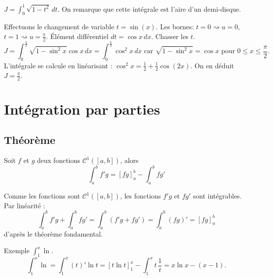 \begin{exple}
 $J = \int_{0}^{1}\sqrt{1-t^2}\,dt$. On remarque que cette intégrale est l'aire d'un demi-disque.
 
Effectuons le changement de variable $t=\sin(x)$.\newline
Les bornes: $t = 0\rightsquigarrow u = 0$, $t = 1\rightsquigarrow u = \frac{\pi}{2}$.\newline
\'Elément différentiel $dt = \cos x\,dx$.\newline
Chasser les $t$.
\[
 J = \int^{\frac{\pi}{2}}_{0}\sqrt{1-\sin^2x}\cos x\,dx
 = \int^{\frac{\pi}{2}}_{0}\cos^2 x\,dx \text{ car } \sqrt{1-\sin^2x}= \cos x \text{ pour } 0\leq x \leq \frac{\pi}{2}.
\]
L'intégrale se calcule en linéarisant : $\cos^2 x = \frac{1}{2} + \frac{1}{2}\cos(2x)$. On en déduit $J = \frac{\pi}{2}$.
\end{exple}

\section{Intégration par parties}
\subsection{Théorème}
\begin{thm}
 Soit $f$ et $g$ deux fonctions $\mathcal{C}^1([a,b])$, alors
\begin{displaymath}
 \int_a^bf'g = [fg]_a^b - \int_a^bfg'
\end{displaymath}
\end{thm}
\begin{demo}
 Comme les fonctions sont $\mathcal{C}^1([a,b])$, les fonctions $f'g$ et $fg'$ sont intégrables. Par linéarité :
\begin{displaymath}
 \int_a^bf'g +\int_a^bfg' = \int_a^b(f'g+fg')=\int_a^b(fg)'=[fg]_a^b  
\end{displaymath}
d'après le théorème fondamental.
\end{demo}
Exemple $\int_{1}^{x}\ln$.
\[
 \int_{1}^{x}\ln = \int_{1}^{x}(t)'\ln t = \left[ t \ln t\right]_{1}^{x} - \int_{1}^{x}t\,\frac{1}{t} = x\ln x -(x-1). 
\]

